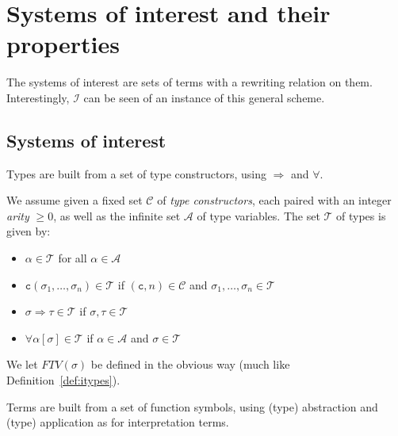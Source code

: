 \documentclass[runningheads,a4paper]{llncs}
\newcommand{\Iterms}{\mathcal{I}}
\newcommand{\Typevars}{\mathcal{A}}
\newcommand{\Types}{\mathcal{T}}
\newcommand{\TypeConstructors}{\mathcal{C}}
\newcommand{\quant}[2]{\forall #1[#2]}
\newcommand{\arrtype}{\Rightarrow}
\newcommand{\FTV}{\mathit{FTV}}
\newcommand{\con}{\mathtt{c}}
\begin{document}
\section{Systems of interest and their properties}

The systems of interest are sets of terms with a rewriting relation on
them.  Interestingly, $\Iterms$ can be seen of an instance of this general
scheme.

\subsection{Systems of interest}

Types are built from a set of type constructors, using $\arrtype$ and
$\forall$.

\begin{definition}
We assume given a fixed set $\TypeConstructors$ of \emph{type
constructors}, each paired with an integer \emph{arity} $\geq 0$, as
well as the infinite set $\Typevars$ of type variables.  The set
$\Types$ of types is given by:
\begin{itemize}
\item $\alpha \in \Types$ for all $\alpha \in \Typevars$
\item $\con(\sigma_1,\dots,\sigma_n) \in \Types$ if $(\con,n) \in
  \TypeConstructors$ and $\sigma_1,\dots,\sigma_n \in \Types$
\item $\sigma \arrtype \tau \in \Types$ if $\sigma,\tau \in \Types$
\item $\quant{\alpha}{\sigma} \in \Types$ if $\alpha \in \Typevars$ and
  $\sigma \in \Types$
\end{itemize}
We let $\FTV(\sigma)$ be defined in the obvious way (much like
Definition~\ref{def:itypes}).
\end{definition}

Terms are built from a set of function symbols, using (type) abstraction
and (type) application as for interpretation terms.
\end{document}

